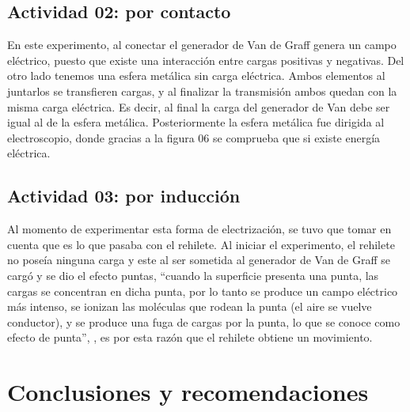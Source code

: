 \subsection{Actividad 02: por contacto}
En este experimento, al conectar el generador de Van de Graff genera un campo eléctrico, puesto que existe una interacción entre cargas positivas y negativas. Del otro lado tenemos una esfera metálica sin carga eléctrica. Ambos elementos al juntarlos se transfieren cargas, y al finalizar la transmisión ambos quedan con la misma carga eléctrica. Es decir, al final la carga del generador de Van debe ser igual al de la esfera metálica. 
Posteriormente la esfera metálica fue dirigida al electroscopio, donde gracias a la figura 06 se comprueba que si existe energía eléctrica.

\subsection{Actividad 03: por inducción}
Al momento de experimentar esta forma de electrización, se tuvo que tomar en cuenta que es lo que pasaba con el rehilete. Al iniciar el experimento, el rehilete no poseía ninguna carga y este al ser sometida al generador de Van de Graff se cargó y se dio el efecto puntas, “cuando la superficie presenta una punta, las cargas se concentran en dicha punta, por lo tanto se produce un campo eléctrico más intenso, se ionizan las moléculas que rodean la punta (el aire se vuelve conductor), y se produce una fuga de cargas por la punta, lo que se conoce como efecto de punta”, \cite{electrostática}, es por esta razón que el rehilete obtiene un movimiento. 

\section{Conclusiones y recomendaciones}
